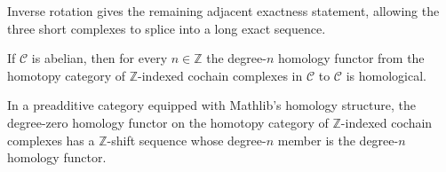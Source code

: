 \begin{theorem}
  \label{thm:mathlib-homology-sequence-exact-one}
  \mathlibok
  Inverse rotation gives the remaining adjacent exactness statement, allowing
  the three short complexes to splice into a long exact sequence.
\end{theorem}

\begin{theorem}
  \label{thm:mathlib-homotopy-cochain-homology-is-homological}
  \mathlibok
  If $\mathcal C$ is abelian, then for every $n\in\mathbb Z$ the degree-$n$
  homology functor from the homotopy category of $\mathbb Z$-indexed cochain
  complexes in $\mathcal C$ to $\mathcal C$ is homological.
\end{theorem}

\begin{definition}
  \label{def:mathlib-homotopy-cochain-homology-shift-sequence}
  \mathlibok
  In a preadditive category equipped with Mathlib's homology structure, the
  degree-zero homology functor on the homotopy category of $\mathbb Z$-indexed
  cochain complexes has a $\mathbb Z$-shift sequence whose degree-$n$ member is
  the degree-$n$ homology functor.
\end{definition}

